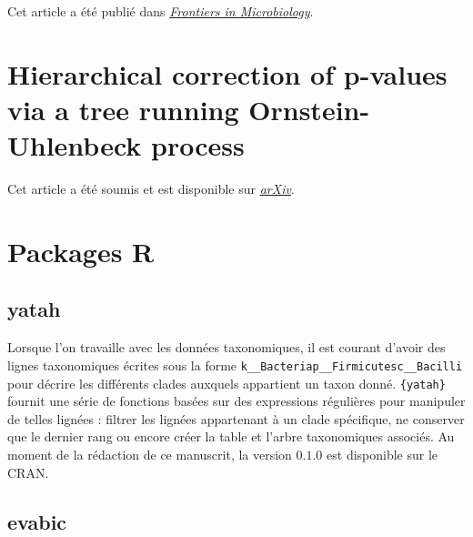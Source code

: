 \documentclass[12pt,a4paper]{reedthesis}
\theoremstyle{definition}
\theoremstyle{definition}
\theoremstyle{definition}
\theoremstyle{remark}
\begin{document}
Cet article a été publié dans \href{https://doi.org/10.3389/fmicb.2020.00649}{\emph{Frontiers in Microbiology}}.





\hypertarget{hierarchical-correction-of-p-values-via-a-tree-running-ornstein-uhlenbeck-process}{%
\section*{Hierarchical correction of p-values via a tree running Ornstein-Uhlenbeck process}\label{hierarchical-correction-of-p-values-via-a-tree-running-ornstein-uhlenbeck-process}}

Cet article a été soumis et est disponible sur \href{http://arxiv.org/abs/2009.13335}{\emph{arXiv}}.



\hypertarget{packages-r}{%
\section*{Packages R}\label{packages-r}}

\hypertarget{yatah}{%
\subsection*{yatah}\label{yatah}}

Lorsque l'on travaille avec les données taxonomiques, il est courant d'avoir des lignes taxonomiques écrites sous la forme \texttt{k\_\_Bacteria\textbar{}p\_\_Firmicutes\textbar{}c\_\_Bacilli} pour décrire les différents clades auxquels appartient un taxon donné. \texttt{\{yatah\}} fournit une série de fonctions basées sur des expressions régulières pour manipuler de telles lignées : filtrer les lignées appartenant à un clade spécifique, ne conserver que le dernier rang ou encore créer la table et l'arbre taxonomiques associés. Au moment de la rédaction de ce manuscrit, la version \(0.1.0\) est disponible sur le CRAN.

\hypertarget{evabic}{%
\subsection*{evabic}\label{evabic}}
\end{document}
